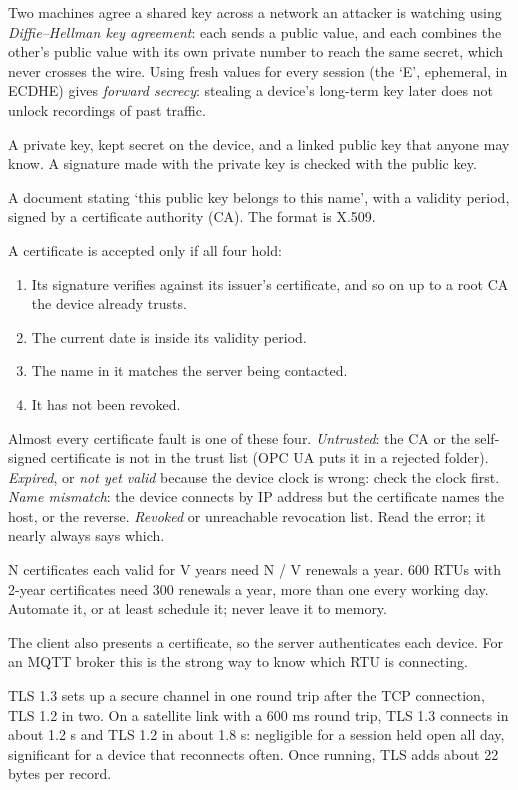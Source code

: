 Two machines agree a shared key across a network an attacker is watching using \emph{Diffie–Hellman key agreement}: each sends a public value, and each combines the other's public value with its own private number to reach the same secret, which never crosses the wire. Using fresh values for every session (the ‘E’, ephemeral, in ECDHE) gives \emph{forward secrecy}: stealing a device's long-term key later does not unlock recordings of past traffic.

 A private key, kept secret on the device, and a linked public key that anyone may know. A signature made with the private key is checked with the public key.

 A document stating ‘this public key belongs to this name’, with a validity period, signed by a certificate authority (CA). The format is X.509.

 A certificate is accepted only if all four hold:
\begin{enumerate}
\item Its signature verifies against its issuer's certificate, and so on up to a root CA the device already trusts.
\item The current date is inside its validity period.
\item The name in it matches the server being contacted.
\item It has not been revoked.
\end{enumerate}
\onsite Almost every certificate fault is one of these four. \emph{Untrusted}: the CA or the self-signed certificate is not in the trust list (OPC UA puts it in a rejected folder). \emph{Expired}, or \emph{not yet valid} because the device clock is wrong: check the clock first. \emph{Name mismatch}: the device connects by IP address but the certificate names the host, or the reverse. \emph{Revoked} or unreachable revocation list. Read the error; it nearly always says which.

 N certificates each valid for V years need N / V renewals a year. 600 RTUs with 2-year certificates need 300 renewals a year, more than one every working day. Automate it, or at least schedule it; never leave it to memory.

 The client also presents a certificate, so the server authenticates each device. For an MQTT broker this is the strong way to know which RTU is connecting.

TLS 1.3 sets up a secure channel in one round trip after the TCP connection, TLS 1.2 in two. On a satellite link with a 600 ms round trip, TLS 1.3 connects in about 1.2 s and TLS 1.2 in about 1.8 s: negligible for a session held open all day, significant for a device that reconnects often. Once running, TLS adds about 22 bytes per record.

